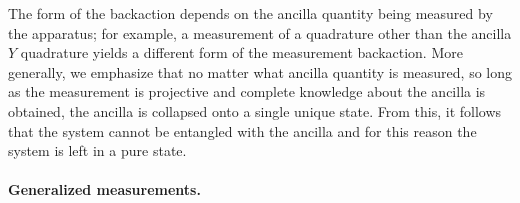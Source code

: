 The form of the backaction depends on the ancilla quantity being measured
by the apparatus; for example, a measurement of a quadrature other
than the ancilla $Y$ quadrature yields a different form of the measurement
backaction. More generally, we emphasize that no matter what ancilla
quantity is measured, so long as the measurement is projective and
complete knowledge about the ancilla is obtained, the ancilla is collapsed
onto a single unique state. From this, it follows that the system
cannot be entangled with the ancilla and for this reason the system
is left in a pure state. 

\paragraph{Generalized measurements. }

